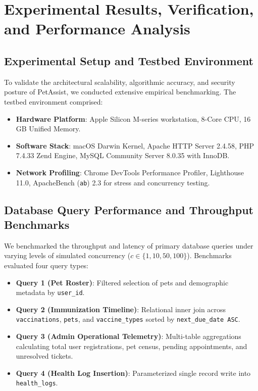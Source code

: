 \documentclass[conference]{IEEEtran}
\begin{document}
\section{Experimental Results, Verification, and Performance Analysis}
\subsection{Experimental Setup and Testbed Environment}
To validate the architectural scalability, algorithmic accuracy, and security posture of PetAssist, we conducted extensive empirical benchmarking. The testbed environment comprised:
\begin{itemize}
    \item \textbf{Hardware Platform}: Apple Silicon M-series workstation, 8-Core CPU, 16 GB Unified Memory.
    \item \textbf{Software Stack}: macOS Darwin Kernel, Apache HTTP Server 2.4.58, PHP 7.4.33 Zend Engine, MySQL Community Server 8.0.35 with InnoDB.
    \item \textbf{Network Profiling}: Chrome DevTools Performance Profiler, Lighthouse 11.0, ApacheBench (\texttt{ab}) 2.3 for stress and concurrency testing.
\end{itemize}

\subsection{Database Query Performance and Throughput Benchmarks}
We benchmarked the throughput and latency of primary database queries under varying levels of simulated concurrency ($c \in \{1, 10, 50, 100\}$). Benchmarks evaluated four query types:
\begin{itemize}
    \item \textbf{Query 1 (Pet Roster)}: Filtered selection of pets and demographic metadata by \texttt{user\_id}.
    \item \textbf{Query 2 (Immunization Timeline)}: Relational inner join across \texttt{vaccinations}, \texttt{pets}, and \texttt{vaccine\_types} sorted by \texttt{next\_due\_date ASC}.
    \item \textbf{Query 3 (Admin Operational Telemetry)}: Multi-table aggregations calculating total user registrations, pet census, pending appointments, and unresolved tickets.
    \item \textbf{Query 4 (Health Log Insertion)}: Parameterized single record write into \texttt{health\_logs}.
\end{itemize}
\end{document}
